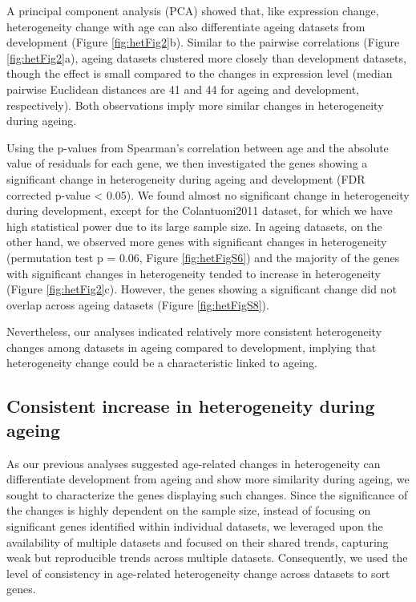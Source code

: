 \documentclass[12pt,twoside]{unicam}
\begin{document}
A principal component analysis (PCA) showed that, like expression change, heterogeneity change with age can also differentiate ageing datasets from development (Figure \ref{fig:hetFig2}b). Similar to the pairwise correlations (Figure \ref{fig:hetFig2}a), ageing datasets clustered more closely than development datasets, though the effect is small compared to the changes in expression level (median pairwise Euclidean distances are 41 and 44 for ageing and development, respectively). Both observations imply more similar changes in heterogeneity during ageing.

Using the p-values from Spearman's correlation between age and the absolute value of residuals for each gene, we then investigated the genes showing a significant change in heterogeneity during ageing and development (FDR corrected p-value \textless{} 0.05). We found almost no significant change in heterogeneity during development, except for the Colantuoni2011 dataset, for which we have high statistical power due to its large sample size. In ageing datasets, on the other hand, we observed more genes with significant changes in heterogeneity (permutation test p = 0.06, Figure \ref{fig:hetFigS6}) and the majority of the genes with significant changes in heterogeneity tended to increase in heterogeneity (Figure \ref{fig:hetFig2}c). However, the genes showing a significant change did not overlap across ageing datasets (Figure \ref{fig:hetFigS8}).

Nevertheless, our analyses indicated relatively more consistent heterogeneity changes among datasets in ageing compared to development, implying that heterogeneity change could be a characteristic linked to ageing.

\hypertarget{consistent-increase-in-heterogeneity-during-ageing}{%
\subsection{Consistent increase in heterogeneity during ageing}\label{consistent-increase-in-heterogeneity-during-ageing}}

As our previous analyses suggested age-related changes in heterogeneity can differentiate development from ageing and show more similarity during ageing, we sought to characterize the genes displaying such changes. Since the significance of the changes is highly dependent on the sample size, instead of focusing on significant genes identified within individual datasets, we leveraged upon the availability of multiple datasets and focused on their shared trends, capturing weak but reproducible trends across multiple datasets. Consequently, we used the level of consistency in age-related heterogeneity change across datasets to sort genes.
\end{document}

